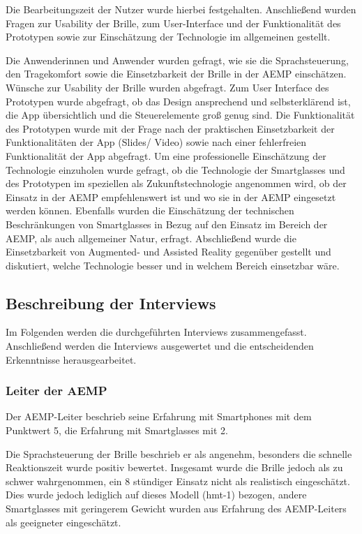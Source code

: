 Die Bearbeitungszeit der Nutzer wurde hierbei festgehalten. Anschließend wurden Fragen zur Usability der Brille, zum User-Interface und der Funktionalität des Prototypen sowie zur Einschätzung der Technologie im allgemeinen gestellt.

Die Anwenderinnen und Anwender wurden gefragt, wie sie die Sprachsteuerung, den Tragekomfort sowie die Einsetzbarkeit der Brille in der AEMP einschätzen. Wünsche zur Usability der Brille wurden abgefragt. Zum User Interface des Prototypen wurde abgefragt, ob das Design ansprechend und selbsterklärend ist, die App übersichtlich und die Steuerelemente groß genug sind. Die Funktionalität des Prototypen wurde mit der Frage nach der praktischen Einsetzbarkeit der Funktionalitäten der App (Slides/ Video) sowie nach einer fehlerfreien Funktionalität der App abgefragt. Um eine professionelle Einschätzung der Technologie einzuholen wurde gefragt, ob die Technologie der Smartglasses und des Prototypen im speziellen als Zukunftstechnologie angenommen wird, ob der Einsatz in der AEMP empfehlenswert ist und wo sie in der AEMP eingesetzt werden können. Ebenfalls wurden die Einschätzung der technischen Beschränkungen von Smartglasses in Bezug auf den Einsatz im Bereich der AEMP, als auch allgemeiner Natur, erfragt. Abschließend wurde die Einsetzbarkeit von Augmented- und Assisted Reality gegenüber gestellt und diskutiert, welche Technologie besser und in welchem Bereich einsetzbar wäre.
%
%
%
%
%
%
%
\subsection{Beschreibung der Interviews}
\label{sec:Beschreinung_der_Interviews}
Im Folgenden werden die durchgeführten Interviews zusammengefasst. Anschließend werden die Interviews ausgewertet und die entscheidenden Erkenntnisse herausgearbeitet.
%
%
\subsubsection{Leiter der AEMP}
%
Der AEMP-Leiter beschrieb seine Erfahrung mit Smartphones mit dem Punktwert 5, die Erfahrung mit Smartglasses mit 2.

Die Sprachsteuerung der Brille beschrieb er als angenehm, besonders die schnelle Reaktionszeit wurde positiv bewertet. Insgesamt wurde die Brille jedoch als zu schwer wahrgenommen, ein 8 stündiger Einsatz nicht als realistisch eingeschätzt. Dies wurde jedoch lediglich auf dieses Modell (hmt-1) bezogen, andere Smartglasses mit geringerem Gewicht wurden aus Erfahrung des AEMP-Leiters als geeigneter eingeschätzt.

